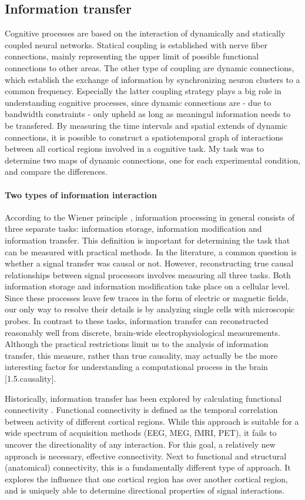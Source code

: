\subsection{Information transfer}
Cognitive processes are based on the interaction of dynamically and statically coupled neural networks.
Statical coupling is established with nerve fiber connections, mainly representing the upper limit of possible functional connections to other areas.
The other type of coupling are dynamic connections, which establish the exchange of information by synchronizing neuron clusters to a common frequency.
Especially the latter coupling strategy plays a big role in understanding cognitive processes, since dynamic connections are - due to bandwidth constraints - only upheld as long as meaningul information needs to be transfered.
By measuring the time intervals and spatial extends of dynamic connections, it is possible to construct a spatiotemporal graph of interactions between all cortical regions involved in a cognitive task.
My task was to determine two maps of dynamic connections, one for each experimental condition, and compare the differences.

\paragraph{Two types of information interaction}
According to the Wiener principle \cite{1.5.information}, information processing in general consists of three separate tasks: information storage, information modification and information transfer.
This definition is important for determining the task that can be measured with practical methods.
In the literature, a common question is whether a signal transfer was causal or not.
However, reconstructing true causal relationships between signal processors involves measuring all three tasks.
Both information storage and information modification take place on a cellular level.
Since these processes leave few traces in the form of electric or magnetic fields, our only way to resolve their details is by analyzing single cells with microscopic probes.
In contrast to these tasks, information transfer can reconstructed reasonably well from discrete, brain-wide electrophysiological measurements.
Although the practical restrictions limit us to the analysis of information transfer, this measure, rather than true causality, may actually be the more interesting factor for understanding a computational process in the brain [1.5.causality].

Historically, information transfer has been explored by calculating functional connectivity \cite{1.5.connectivity}.
Functional connectivity is defined as the temporal correlation between activity of different cortical regions.
While this approach is suitable for a wide spectrum of acquisition methods (EEG, MEG, fMRI, PET), it fails to uncover the directionality of any interaction.
For this goal, a relatively new approach is necessary, effective connectivity.
Next to functional and structural (anatomical) connectivity, this is a fundamentally different type of approach.
It explores the influence that one cortical region has over another cortical region, and is uniquely able to determine directional properties of signal interactions.

